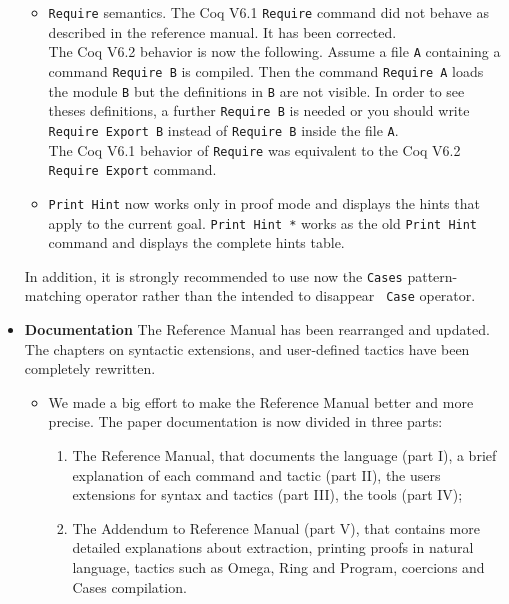 \documentclass[11pt]{article}
\begin{document}
\begin{itemize}
\begin{itemize}
  \item \texttt{Require} semantics. The Coq V6.1 \texttt{Require}
    command did not behave as described in the reference manual. 
    It has been corrected.\\
    The Coq V6.2 behavior is now the following.
    Assume a file \texttt{A} containing a
    command \texttt{Require B} is compiled. Then the command
    \texttt{Require A} loads the module \texttt{B} but the definitions
    in \texttt{B} are not visible. In order to see theses definitions,
    a further \texttt{Require B} is
    needed or you should write \texttt{Require Export B} instead of 
    \texttt{Require B} inside the file \texttt{A}. \\
    The Coq V6.1 behavior of \texttt{Require} was equivalent to the
    Coq V6.2 \texttt{Require Export} command.
   \item \texttt{Print Hint} now works only in proof mode and displays
     the hints that apply to the current goal. \texttt{Print Hint *}
     works as the old \texttt{Print Hint} command and displays  the complete
     hints table.

  \end{itemize}

  In addition, it is strongly recommended to use now the {\tt Cases}
  pattern-matching operator rather than the intended to disappear {\tt
  Case} operator.

\item \textbf{Documentation}
 The Reference Manual has been rearranged and
  updated. The chapters on syntactic extensions, and user-defined
  tactics have been completely rewritten.

  \begin{itemize}
  \item We made a big effort to make the Reference Manual better and
    more precise. The paper documentation is now divided in three
    parts:
    \begin{enumerate}
    \item The Reference Manual, that documents the language (part I), 
      a brief explanation of each command and tactic (part II), the
      users extensions for syntax and tactics (part III), the tools
      (part IV);

    \item The Addendum to Reference Manual (part V), that contains
      more detailed explanations about extraction, printing proofs in
      natural language, tactics such as Omega, Ring and Program,
      coercions and Cases compilation.


\end{enumerate}
\end{itemize}
\end{itemize}
\end{document}
